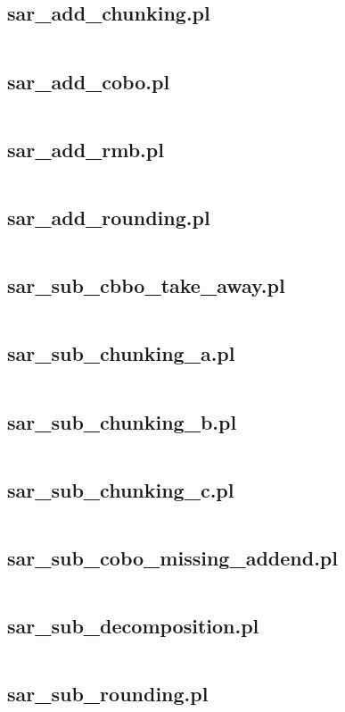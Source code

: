\documentclass{article}
\begin{document}
\subsection{sar\_add\_chunking.pl}
\inputminted{prolog}{sar_add_chunking.pl}
\subsection{sar\_add\_cobo.pl}
\inputminted{prolog}{sar_add_cobo.pl}
\subsection{sar\_add\_rmb.pl}
\inputminted{prolog}{sar_add_rmb.pl}
\subsection{sar\_add\_rounding.pl}
\inputminted{prolog}{sar_add_rounding.pl}
\subsection{sar\_sub\_cbbo\_take\_away.pl}
\inputminted{prolog}{sar_sub_cbbo_take_away.pl}
\subsection{sar\_sub\_chunking\_a.pl}
\inputminted{prolog}{sar_sub_chunking_a.pl}
\subsection{sar\_sub\_chunking\_b.pl}
\inputminted{prolog}{sar_sub_chunking_b.pl}
\subsection{sar\_sub\_chunking\_c.pl}
\inputminted{prolog}{sar_sub_chunking_c.pl}
\subsection{sar\_sub\_cobo\_missing\_addend.pl}
\inputminted{prolog}{sar_sub_cobo_missing_addend.pl}
\subsection{sar\_sub\_decomposition.pl}
\inputminted{prolog}{sar_sub_decomposition.pl}
\subsection{sar\_sub\_rounding.pl}
\inputminted{prolog}{sar_sub_rounding.pl}
\end{document}
